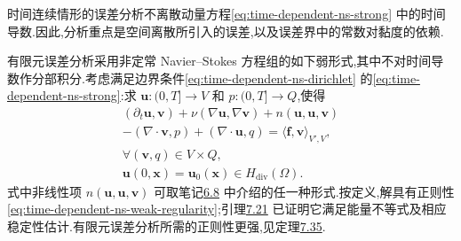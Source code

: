 \begin{note}[动机]
\label{note:time-dependent-fem-continuous-motivation}
时间连续情形的误差分析不离散动量方程\cref{eq:time-dependent-ns-strong} 中的时间导数.因此,分析重点是空间离散所引入的误差,以及误差界中的常数对黏度的依赖.
\end{note}

\begin{note}[弱形式]
\label{note:time-dependent-fem-continuous-weak-form}
有限元误差分析采用非定常 Navier--Stokes 方程组的如下弱形式,其中不对时间导数作分部积分.考虑满足边界条件\cref{eq:time-dependent-ns-dirichlet} 的\cref{eq:time-dependent-ns-strong}:求
$\bm{u}:(0,T]\to V$ 和 $p:(0,T]\to Q$,使得
\begin{equation}\label{eq:time-dependent-time-continuous-weak}
\begin{gathered}
  (\partial_t\bm{u},\bm{v})
    +\nu(\nabla\bm{u},\nabla\bm{v})
    +n(\bm{u},\bm{u},\bm{v})\\
  -(\nabla\cdot\bm{v},p)
    +(\nabla\cdot\bm{u},q)
    =\langle\bm{f},\bm{v}\rangle_{V',V},\\
  \forall(\bm{v},q)\in V\times Q,\\
  \bm{u}(0,\bm{x})=\bm{u}_0(\bm{x})
      \in H_{\mathrm{div}}(\Omega).
\end{gathered}
\end{equation}
式中非线性项 $n(\bm{u},\bm{u},\bm{v})$ 可取笔记\hyperref[note:steady-ns-equivalent-variational-forms]{6.8} 中介绍的任一种形式.按定义,解具有正则性\cref{eq:time-dependent-ns-weak-regularity};引理\hyperref[lem:time-dependent-energy-stability]{7.21} 已证明它满足能量不等式及相应稳定性估计.有限元误差分析所需的正则性更强,见定理\hyperref[thm:time-dependent-fem-velocity-error]{7.35}.
\end{note}

